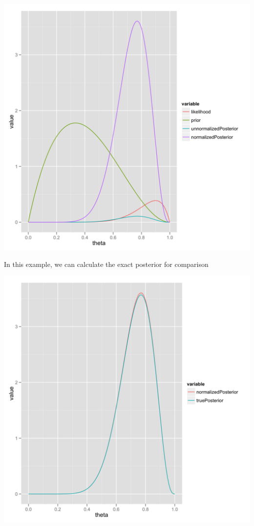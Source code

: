 \documentclass{beamer}
\begin{document}
\frame
{
  \begin{center}
    \includegraphics[scale = 0.1]{grid_approximation.png}
  \end{center}
}

\frame
{
  \begin{center}
    In this example, we can calculate the exact posterior for comparison
  \end{center}
}

\frame
{
  \begin{center}
    \includegraphics[scale = 0.1]{grid_quality.png}
  \end{center}
}
\end{document}
